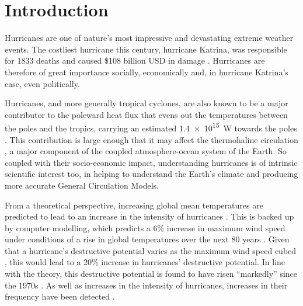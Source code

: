 \documentclass[pdftex,12pt,a4paper]{report}
\begin{document}
\newpage

\tableofcontents

\chapter{Introduction}


Hurricanes are one of nature's most impressive and devastating extreme weather events. The costliest
hurricane this century, hurricane Katrina, was responsible for 1833 deaths and caused \$108
billion USD in damage \parencite{TODOCITE}. Hurricanes are therefore of great importance socially,
economically and, in hurricane Katrina's case, even politically.

Hurricanes, and more generally tropical cyclones, are also known to be a major contributor to the
poleward heat flux that evens out the temperatures between the poles and the tropics, carrying an
estimated \SI{1.4e15}{W} towards the poles \parencite{emanuelContribution2012}. This
contribution is large enough that it may affect the thermohaline circulation
\parencite{huEffect2009}, a major component of the coupled atmosphere-ocean system of the Earth. So
coupled with their socio-economic impact, understanding hurricanes is of intrinsic scientific
interest too, in helping to understand the Earth's climate and producing more accurate General
Circulation Models.

From a theoretical perspective, increasing global mean temperatures are predicted to lead to an
increase in the intensity of hurricanes \parencite{emanuelDependence1987}. This is backed up by
computer modelling, which predicts a 6\% increase in maximum wind speed under conditions of a rise
in global temperatures over the next 80 years \parencite{knutsonImpact2004}. Given that a
hurricane's destructive potential varies as the maximum wind speed cubed
\parencite{emanuelIncreasing2005}, this would lead to a 20\% increase in hurricanes' destructive
potential. In line with the theory, this destructive potential is found to have risen ``markedly''
since the 1970s \parencite{emanuelIncreasing2005}. As well as increases in the intensity of
hurricanes, increases in their frequency have been detected \parencite{goldbergRecent2001,
websterChanges2005, hollandHeightened2007}.
\end{document}

